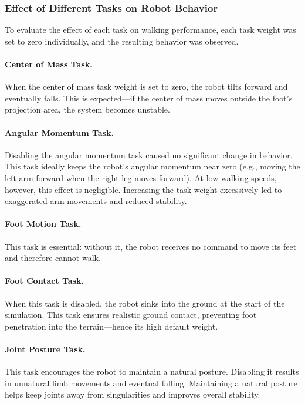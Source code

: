 \documentclass[12pt]{article}
\begin{document}
\subsubsection{Effect of Different Tasks on Robot Behavior}

To evaluate the effect of each task on walking performance, each task weight was set to zero individually, and the resulting behavior was observed.

\paragraph{Center of Mass Task.}
When the center of mass task weight is set to zero, the robot tilts forward and eventually falls.  
This is expected—if the center of mass moves outside the foot’s projection area, the system becomes unstable.

\paragraph{Angular Momentum Task.}
Disabling the angular momentum task caused no significant change in behavior.  
This task ideally keeps the robot’s angular momentum near zero (e.g., moving the left arm forward when the right leg moves forward).  
At low walking speeds, however, this effect is negligible.  
Increasing the task weight excessively led to exaggerated arm movements and reduced stability.

\paragraph{Foot Motion Task.}
This task is essential: without it, the robot receives no command to move its feet and therefore cannot walk.

\paragraph{Foot Contact Task.}
When this task is disabled, the robot sinks into the ground at the start of the simulation.
This task ensures realistic ground contact, preventing foot penetration into the terrain—hence its high default weight.

\paragraph{Joint Posture Task.}
This task encourages the robot to maintain a natural posture.  
Disabling it results in unnatural limb movements and eventual falling.  
Maintaining a natural posture helps keep joints away from singularities and improves overall stability.
\end{document}
